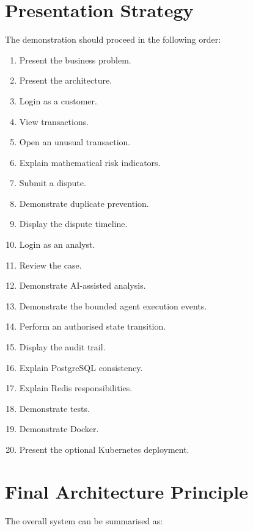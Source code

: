 \documentclass[11pt,a4paper]{article}
\begin{document}
\section{Presentation Strategy}

The demonstration should proceed in the following order:

\begin{enumerate}
    \item Present the business problem.
    \item Present the architecture.
    \item Login as a customer.
    \item View transactions.
    \item Open an unusual transaction.
    \item Explain mathematical risk indicators.
    \item Submit a dispute.
    \item Demonstrate duplicate prevention.
    \item Display the dispute timeline.
    \item Login as an analyst.
    \item Review the case.
    \item Demonstrate AI-assisted analysis.
    \item Demonstrate the bounded agent execution events.
    \item Perform an authorised state transition.
    \item Display the audit trail.
    \item Explain PostgreSQL consistency.
    \item Explain Redis responsibilities.
    \item Demonstrate tests.
    \item Demonstrate Docker.
    \item Present the optional Kubernetes deployment.
\end{enumerate}

\section{Final Architecture Principle}

The overall system can be summarised as:
\end{document}
